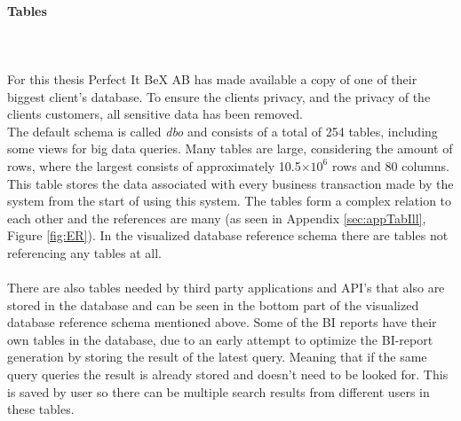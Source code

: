 \documentclass{cslthse-msc}
\begin{document}
\paragraph*{Tables}\mbox{}\\\\
For this thesis Perfect It BeX AB has made available a copy of one of their biggest client's database. To ensure the clients privacy, and the privacy of the clients customers, all sensitive data has been removed. \\ 
The default schema is called \textit{dbo} and consists of a total of 254 tables, including some views for big data queries. Many tables are large, considering the amount of rows, where the largest consists of approximately 10.5$\times 10^6$ rows and 80 columns. This table stores the data associated with every business transaction made by the system from the start of using this system. The tables form a complex relation to each other and the references are many (as seen in Appendix \ref{sec:appTabIll}, Figure \ref{fig:ER}). In the visualized database reference schema there are tables not referencing any tables at all.\\\\
There are also tables needed by third party applications and API's that also are stored in the database and can be seen in the bottom part of the visualized database reference schema mentioned above. Some of the BI reports have their own tables in the database, due to an early attempt to optimize the BI-report generation by storing the result of the latest query. Meaning that if the same query queries the result is already stored and doesn't need to be looked for. This is saved by user so there can be multiple search results from different users in these tables.
\end{document}
